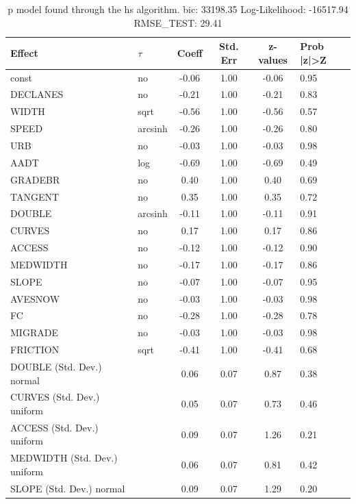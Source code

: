 \begin{table}
	\caption{p model found through the hs algorithm. bic: 33198.35 Log-Likelihood: -16517.94 RMSE_TEST: 29.41}
	\begin{center}
		\begin{tabular}{|l|l|c|c|c|l|}
			\hline
			Effect & $\tau$ & Coeff & Std. Err & z-values & Prob |z|>Z \\
			\hline
			const & no & -0.06 & 1.00 & -0.06 & 0.95 \\
			\hline
			DECLANES & no & -0.21 & 1.00 & -0.21 & 0.83 \\
			\hline
			WIDTH & sqrt & -0.56 & 1.00 & -0.56 & 0.57 \\
			\hline
			SPEED & arcsinh & -0.26 & 1.00 & -0.26 & 0.80 \\
			\hline
			URB & no & -0.03 & 1.00 & -0.03 & 0.98 \\
			\hline
			AADT & log & -0.69 & 1.00 & -0.69 & 0.49 \\
			\hline
			GRADEBR & no & 0.40 & 1.00 & 0.40 & 0.69 \\
			\hline
			TANGENT & no & 0.35 & 1.00 & 0.35 & 0.72 \\
			\hline
			DOUBLE & arcsinh & -0.11 & 1.00 & -0.11 & 0.91 \\
			\hline
			CURVES & no & 0.17 & 1.00 & 0.17 & 0.86 \\
			\hline
			ACCESS & no & -0.12 & 1.00 & -0.12 & 0.90 \\
			\hline
			MEDWIDTH & no & -0.17 & 1.00 & -0.17 & 0.86 \\
			\hline
			SLOPE & no & -0.07 & 1.00 & -0.07 & 0.95 \\
			\hline
			AVESNOW & no & -0.03 & 1.00 & -0.03 & 0.98 \\
			\hline
			FC & no & -0.28 & 1.00 & -0.28 & 0.78 \\
			\hline
			MIGRADE & no & -0.03 & 1.00 & -0.03 & 0.98 \\
			\hline
			FRICTION & sqrt & -0.41 & 1.00 & -0.41 & 0.68 \\
			\hline
			DOUBLE (Std. Dev.) normal &  & 0.06 & 0.07 & 0.87 & 0.38 \\
			\hline
			CURVES (Std. Dev.) uniform &  & 0.05 & 0.07 & 0.73 & 0.46 \\
			\hline
			ACCESS (Std. Dev.) uniform &  & 0.09 & 0.07 & 1.26 & 0.21 \\
			\hline
			MEDWIDTH (Std. Dev.) uniform &  & 0.06 & 0.07 & 0.81 & 0.42 \\
			\hline
			SLOPE (Std. Dev.) normal &  & 0.09 & 0.07 & 1.29 & 0.20 \\

\end{tabular}
\end{center}
\end{table}
